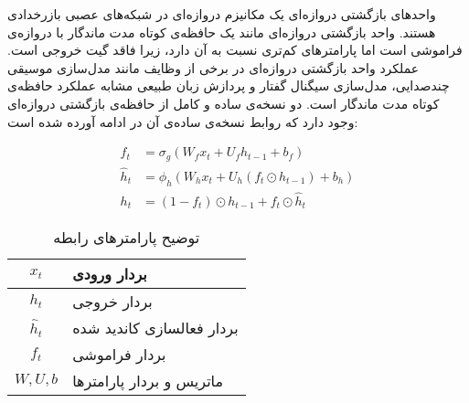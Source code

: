 واحدهای بازگشتی دروازه‌ای یک مکانیزم دروازه‌ای در شبکه‌های عصبی بازرخدادی هستند. واحد بازگشتی دروازه‌ای مانند یک حافظه‌ی کوتاه مدت ماندگار با دروازه‌ی فراموشی است اما پارامترهای کم‌تری نسبت به آن دارد، زیرا فاقد گیت خروجی است. عملکرد واحد بازگشتی دروازه‌ای در برخی از وظایف مانند مدل‌سازی موسیقی چندصدایی، مدل‌سازی سیگنال گفتار و پردازش زبان طبیعی مشابه عملکرد حافظه‌ی کوتاه مدت ماندگار است. دو نسخه‌ی ساده و کامل از حافظه‌ی بازگشتی دروازه‌ای وجود دارد که روابط نسخه‌ی ساده‌ی آن در ادامه آورده شده است:


\begin{equation}
  \label{eq:base}
  \begin{aligned}
  f_{t}& = \sigma _{g} ( W_{f} x_{t} + U_{f} h_{t-1} + b_{f} )\\
  {\hat {h}}_{t}& = \phi _{h}(W_{h}x_{t}+U_{h}(f_{t}\odot h_{t-1})+b_{h})\\
  h_{t}& = (1-f_{t})\odot h_{t-1}+f_{t}\odot {\hat {h}}_{t}
  \end{aligned}
\end{equation}


\begin{table}[h]
  \centering
  \caption{توضیح پارامترهای رابطه }
  \begin{tabular}{|c|p{}|}
    \hline
    $x_{t}$ & بردار ورودی \\
    \hline
    $h_{t}$ & بردار خروجی \\
    \hline
    ${\hat {h}}_{t}$ & بردار فعالسازی کاندید شده \\
    \hline
    $f_{t}$ & بردار فراموشی \\
    \hline
    $W, U ,b$ & ماتریس و بردار پارامترها \\
    \hline
  \end{tabular}
  \label{tbl:distance}
\end{table}
